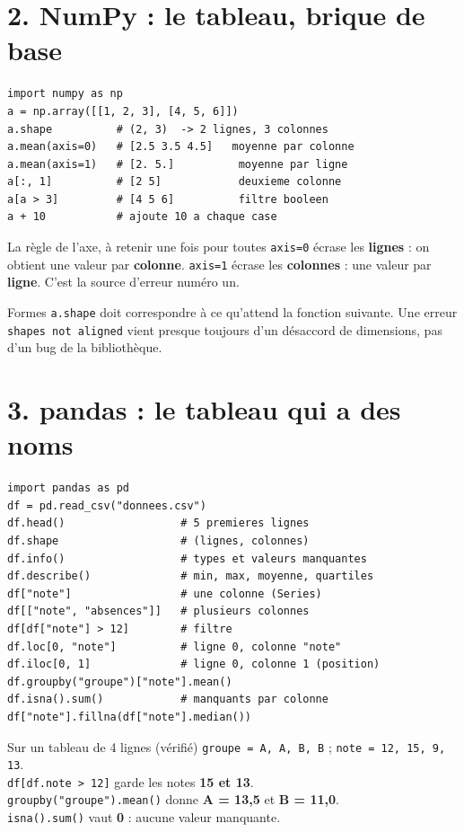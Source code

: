 \documentclass[9.5pt,a4paper]{article}
\begin{document}
\section*{\color{bleu}2. NumPy : le tableau, brique de base}
\begin{lstlisting}
import numpy as np
a = np.array([[1, 2, 3], [4, 5, 6]])
a.shape          # (2, 3)  -> 2 lignes, 3 colonnes
a.mean(axis=0)   # [2.5 3.5 4.5]   moyenne par colonne
a.mean(axis=1)   # [2. 5.]          moyenne par ligne
a[:, 1]          # [2 5]            deuxieme colonne
a[a > 3]         # [4 5 6]          filtre booleen
a + 10           # ajoute 10 a chaque case
\end{lstlisting}

\begin{astuce}{La règle de l'axe, à retenir une fois pour toutes}
\texttt{axis=0} écrase les \textbf{lignes} : on obtient une valeur par
\textbf{colonne}. \quad \texttt{axis=1} écrase les \textbf{colonnes} : une
valeur par \textbf{ligne}. C'est la source d'erreur numéro un.
\end{astuce}

\begin{piege}{Formes}
\texttt{a.shape} doit correspondre à ce qu'attend la fonction suivante.
Une erreur \texttt{shapes not aligned} vient presque toujours d'un désaccord
de dimensions, pas d'un bug de la bibliothèque.
\end{piege}

\section*{\color{bleu}3. pandas : le tableau qui a des noms}
\begin{lstlisting}
import pandas as pd
df = pd.read_csv("donnees.csv")
df.head()                  # 5 premieres lignes
df.shape                   # (lignes, colonnes)
df.info()                  # types et valeurs manquantes
df.describe()              # min, max, moyenne, quartiles
df["note"]                 # une colonne (Series)
df[["note", "absences"]]   # plusieurs colonnes
df[df["note"] > 12]        # filtre
df.loc[0, "note"]          # ligne 0, colonne "note"
df.iloc[0, 1]              # ligne 0, colonne 1 (position)
df.groupby("groupe")["note"].mean()
df.isna().sum()            # manquants par colonne
df["note"].fillna(df["note"].median())
\end{lstlisting}

\begin{astuce}{Sur un tableau de 4 lignes (vérifié)}
\texttt{groupe = A, A, B, B} ; \texttt{note = 12, 15, 9, 13}.\\
\texttt{df[df.note > 12]} garde les notes \textbf{15 et 13}.\\
\texttt{groupby("groupe").mean()} donne \textbf{A = 13,5} et \textbf{B = 11,0}.\\
\texttt{isna().sum()} vaut \textbf{0} : aucune valeur manquante.
\end{astuce}
\end{document}
